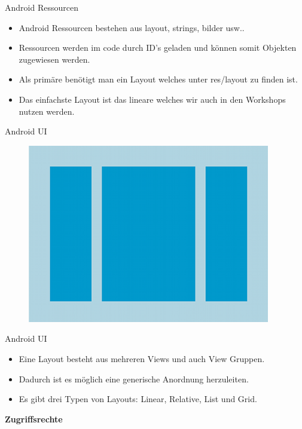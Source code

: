 \documentclass{beamer}
\begin{document}
\begin{frame}{Android Ressourcen}
\begin{itemize}
\item Android Ressourcen bestehen aus layout, strings, bilder usw..
\item Ressourcen werden im code durch ID's geladen und können somit Objekten zugewiesen werden.
\item Als primäre benötigt man ein Layout welches unter res/layout zu finden ist.
\item Das einfachste Layout ist das lineare welches wir auch in den Workshops nutzen werden.
\end{itemize}
\end{frame}

\begin{frame}{Android UI}
\begin{figure}[hb]
 \centering
 \includegraphics[scale=0.6]{android-layout}
\end{figure}
\end{frame}

\begin{frame}{Android UI}
\begin{itemize}
\item Eine Layout besteht aus mehreren Views und auch View Gruppen.
\item Dadurch ist es möglich eine generische Anordnung herzuleiten.
\item Es gibt drei Typen von Layouts: Linear, Relative, List und Grid.
\end{itemize}
\end{frame}

\begin{frame}
\begin{center}
\huge\textbf{Zugriffsrechte}
\end{center}
\end{frame}
\end{document}

